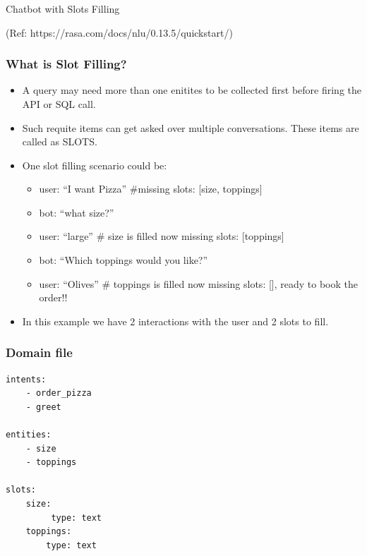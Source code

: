 \begin{frame}[fragile]\frametitle{}
\begin{center}
{\Large Chatbot with Slots Filling}
\end{center}

{\tiny (Ref: https://rasa.com/docs/nlu/0.13.5/quickstart/)}
\end{frame}

 \begin{frame}[fragile]\frametitle{What is Slot Filling?}
\begin{itemize}
\item A query may need more than one enitites to be collected first before firing the API or SQL call.
\item Such requite items can get asked over multiple conversations. These items are called as SLOTS.
\item One slot filling scenario could be:
\begin{itemize}
\item user: “I want Pizza” \#missing slots: [size, toppings]
\item bot: “what size?”
\item user: “large” \# size is filled now missing slots: [toppings]
\item bot: “Which toppings would you like?” 
\item user: “Olives” \# toppings is filled now missing slots: [], ready to book the order!!
\end{itemize}
\item In this example we have 2 interactions with the user and 2 slots to fill.
\end{itemize}

\end{frame}


 \begin{frame}[fragile]\frametitle{Domain file}
\begin{lstlisting}
intents:
    - order_pizza
    - greet

entities:
    - size
    - toppings

slots:
    size:
         type: text
    toppings:
        type: text

\end{lstlisting}
\end{frame}



